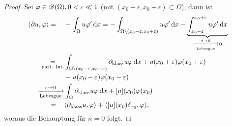 \begin{bsp}
\begin{enumerate}[(a)]
\begin{proof}
      Sei $\varphi\in\mathscr{D}(\Omega), 0<\varepsilon\ll 1$ (mit $(x_0-\epsilon,x_0+\epsilon)\subset\Omega$), dann ist
      \begin{align*}
        \langle\partial u,\varphi\rangle=\quad \, &-\int_\Omega u\varphi'\,\mathrm{d} x
        =-\int_{\Omega\setminus(x_0-\varepsilon,x_0+\varepsilon)}u\varphi'\,\mathrm{d} x
        -\underbrace{\int_{x_0-\varepsilon}^{x_0+\varepsilon}u\varphi'\,\mathrm{d} x}
        _{\xrightarrow[\text{Lebesgue}]{\varepsilon\rightarrow0}0} \\
        \underset{\scriptsize\text{part. Int.}}=&\int_{\Omega\setminus(x_0-\varepsilon,x_0+\varepsilon)}
        \partial_{\text{klass}}u\varphi\,\mathrm{d} x+u(x_0+\varepsilon)\varphi(x_0+\varepsilon)\\
        & -u(x_0-\varepsilon)\varphi(x_0-\varepsilon) \\
        \xrightarrow[\scriptsize\text{Lebesgue}]{\varepsilon\rightarrow0}&\int_\Omega\partial_{\text{klass}}u\varphi\,\mathrm{d} x+[u](x_0)\varphi(x_0) \\
        =\quad \,&\langle\partial_{\text{klass}}u,\varphi\rangle+\langle[u](x_0)\delta_{x_0},\varphi\rangle,
      \end{align*}
      woraus die Behauptung für $n=0$ folgt.
    \end{proof}
  \end{enumerate}
\end{bsp}

